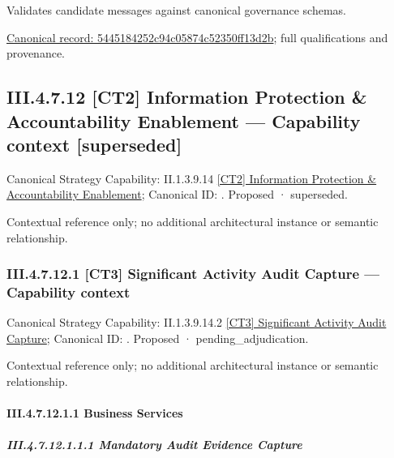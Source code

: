 Validates candidate messages against canonical governance schemas.


{\footnotesize \href{../../../../../../../continuum/business/business-function/5445184252c94c05874c52350ff13d2b.md}{Canonical record: 5445184252c94c05874c52350ff13d2b}; full qualifications and provenance.}\par
\subsection*{III.4.7.12 [CT2] Information Protection \& Accountability Enablement — Capability context [superseded]}
\label{navigation:III.4.7.12}

{\small Canonical Strategy Capability: II.1.3.9.14 \hyperref[element:e922cba7cf1d4ebeb9abf6472a3803ce]{[CT2] Information Protection \& Accountability Enablement}; Canonical ID: \texttt{}. Proposed · superseded.}\par
Contextual reference only; no additional architectural instance or semantic relationship.\par
\subsubsection*{III.4.7.12.1 [CT3] Significant Activity Audit Capture — Capability context}
\label{navigation:III.4.7.12.1}

{\small Canonical Strategy Capability: II.1.3.9.14.2 \hyperref[element:d903948169eb4785b0f03d916c842a8a]{[CT3] Significant Activity Audit Capture}; Canonical ID: \texttt{}. Proposed · pending\_adjudication.}\par
Contextual reference only; no additional architectural instance or semantic relationship.\par
\paragraph*{III.4.7.12.1.1 Business Services}
\label{navigation:III.4.7.12.1.1}

\subparagraph*{III.4.7.12.1.1.1 Mandatory Audit Evidence Capture}
\label{navigation:III.4.7.12.1.1.1}

